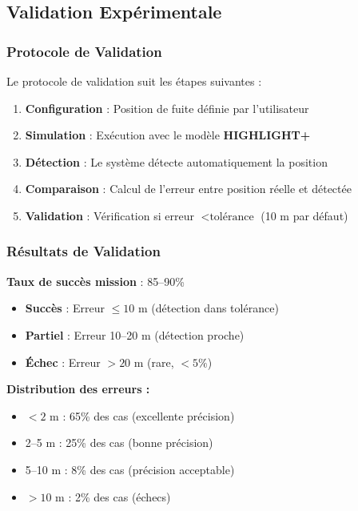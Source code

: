 \documentclass[12pt,a4paper]{article}
\newcommand{\highlight}{\textbf{HIGHLIGHT+}}
\begin{document}
\subsection{Validation Expérimentale}

\subsubsection{Protocole de Validation}

Le protocole de validation suit les étapes suivantes :

\begin{enumerate}
    \item \textbf{Configuration} : Position de fuite définie par l'utilisateur
    \item \textbf{Simulation} : Exécution avec le modèle \highlight{}
    \item \textbf{Détection} : Le système détecte automatiquement la position
    \item \textbf{Comparaison} : Calcul de l'erreur entre position réelle et détectée
    \item \textbf{Validation} : Vérification si erreur $< \text{tolérance}$ (10 m par défaut)
\end{enumerate}

\subsubsection{Résultats de Validation}

\textbf{Taux de succès mission} : 85--90\%

\begin{itemize}
    \item \textbf{Succès} : Erreur $\leq 10$ m (détection dans tolérance)
    \item \textbf{Partiel} : Erreur 10--20 m (détection proche)
    \item \textbf{Échec} : Erreur $> 20$ m (rare, $< 5\%$)
\end{itemize}

\textbf{Distribution des erreurs :}
\begin{itemize}
    \item $< 2$ m : 65\% des cas (excellente précision)
    \item 2--5 m : 25\% des cas (bonne précision)
    \item 5--10 m : 8\% des cas (précision acceptable)
    \item $> 10$ m : 2\% des cas (échecs)
\end{itemize}
\end{document}
